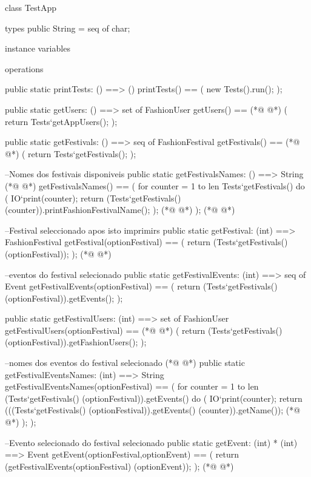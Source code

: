 \begin{vdmpp}[breaklines=true]
class TestApp

types
public String = seq of char;

instance variables

operations

public static printTests: () ==> ()
 printTests() == 
 (
    new Tests().run();   
   );
   
   
 public static getUsers: () ==> set of FashionUser
 getUsers() ==
(*@
\label{printTests:19}
@*)
 ( 
 return Tests`getAppUsers();
 );
 
  
  public static getFestivals: () ==> seq of FashionFestival
  getFestivals() ==
(*@
\label{getUsers:26}
@*)
  (
   return Tests`getFestivals();
  );
   
  --Nomes dos festivais disponiveis
  public static getFestivalsNames: () ==> String
(*@
\label{registerUser:32}
@*)
 getFestivalsNames() ==
 ( 
 for counter = 1 to len Tests`getFestivals() do (
   IO`print(counter);
    return (Tests`getFestivals() (counter)).printFashionFestivalName();
   );
(*@
\label{setAppUser:38}
@*)
  );   
(*@
\label{getFestivals:39}
@*)
  
  --Festival seleccionado apos isto imprimirs
  public static getFestival: (int) ==> FashionFestival
  getFestival(optionFestival) ==
  ( 
  return (Tests`getFestivals() (optionFestival));
  );
(*@
\label{getFestivalsNames:46}
@*)
  
  --eventos do festival selecionado
  public static getFestivalEvents: (int) ==> seq of Event
  getFestivalEvents(optionFestival) ==
  ( 
  return (Tests`getFestivals() (optionFestival)).getEvents();
  );
  
  public static getFestivalUsers: (int) ==> set of FashionUser
  getFestivalUsers(optionFestival) ==
(*@
\label{getFestival:56}
@*)
  ( 
  return (Tests`getFestivals() (optionFestival)).getFashionUsers();
  );
  
  
    
  --nomes dos eventos do festival selecionado
(*@
\label{getFestivalEvents:63}
@*)
  public static getFestivalEventsNames: (int) ==> String
  getFestivalEventsNames(optionFestival) ==
  ( 
    for counter = 1 to len (Tests`getFestivals() (optionFestival)).getEvents() do (
    IO`print(counter);
    return (((Tests`getFestivals() (optionFestival)).getEvents() (counter)).getName());
(*@
\label{getFestivalUsers:69}
@*)
    );
  );

 --Evento selecionado do festival selecionado
 public static getEvent: (int) * (int) ==> Event
  getEvent(optionFestival,optionEvent) ==
  ( 
  return (getFestivalEvents(optionFestival) (optionEvent));
  );
(*@
\label{getFestivalEventsNames:78}
@*)
  

\end{vdmpp}
